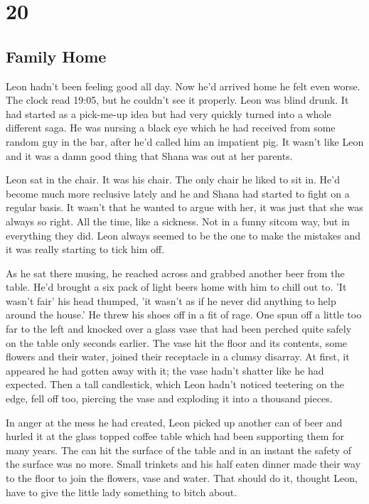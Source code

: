 \chapter{20}
\section{Family Home}


Leon hadn't been feeling good all day.  Now he'd arrived home he felt even worse.  The clock read 19:05, but he couldn't see it properly.  Leon was blind drunk.  It had started as a pick-me-up idea but had very quickly turned into a whole different saga.  He was nursing a black eye which he had received from some random guy in the bar, after he'd called him an impatient pig.  It wasn't like Leon and it was a damn good thing that Shana was out at her parents.  

Leon sat in the chair.  It was his chair.  The only chair he liked to sit in.  He'd become much more reclusive lately and he and Shana had started to fight on a regular basis.  It wasn't that he wanted to argue with her, it was just that she was always so right.  All the time, like a sickness.  Not in a funny sitcom way, but in everything they did.  Leon always seemed to be the one to make the mistakes and it was really starting to tick him off.

As he sat there musing, he reached across and grabbed another beer from the table.  He'd brought a six pack of light beers home with him to chill out to.  'It wasn't fair' his head thumped, 'it wasn't as if he never did anything to help around the house.'  He threw his shoes off in a fit of rage.  One spun off a little too far to the left and knocked over a glass vase that had been perched quite safely on the table only seconds earlier.  The vase hit the floor and its contents, some flowers and their water, joined their receptacle in a clumsy disarray.  At first, it appeared he had gotten away with it; the vase hadn't shatter like he had expected.  Then a tall candlestick, which Leon hadn't noticed teetering on the edge, fell off too, piercing the vase and exploding it into a thousand pieces.  

In anger at the mess he had created, Leon picked up another can of beer and hurled it at the glass topped coffee table which had been supporting them for many years.  The can hit the surface of the table and in an instant the safety of the surface was no more.  Small trinkets and his half eaten dinner made their way to the floor to join the flowers, vase and water.  That should do it, thought Leon, have to give the little lady something to bitch about.


